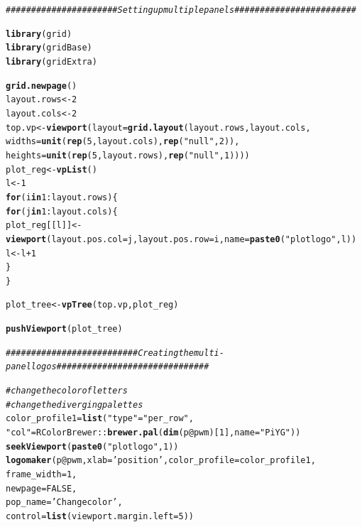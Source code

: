 \documentclass[12pt]{article}\usepackage[]{graphicx}\usepackage[usenames,dvipsnames]{color}
\makeatletter
\newcommand{\hlnum}[1]{\textcolor[rgb]{0.686,0.059,0.569}{#1}}%
\newcommand{\hlstr}[1]{\textcolor[rgb]{0.192,0.494,0.8}{#1}}%
\newcommand{\hlcom}[1]{\textcolor[rgb]{0.678,0.584,0.686}{\textit{#1}}}%
\newcommand{\hlopt}[1]{\textcolor[rgb]{0,0,0}{#1}}%
\newcommand{\hlstd}[1]{\textcolor[rgb]{0.345,0.345,0.345}{#1}}%
\newcommand{\hlkwa}[1]{\textcolor[rgb]{0.161,0.373,0.58}{\textbf{#1}}}%
\newcommand{\hlkwb}[1]{\textcolor[rgb]{0.69,0.353,0.396}{#1}}%
\newcommand{\hlkwc}[1]{\textcolor[rgb]{0.333,0.667,0.333}{#1}}%
\newcommand{\hlkwd}[1]{\textcolor[rgb]{0.737,0.353,0.396}{\textbf{#1}}}%
\newenvironment{kframe}{%
 \def\at@end@of@kframe{}%
 \ifinner\ifhmode%
  \def\at@end@of@kframe{\end{minipage}}%
  \begin{minipage}{\columnwidth}%
 \fi\fi%
 \def\FrameCommand##1{\hskip\@totalleftmargin \hskip-\fboxsep
 \colorbox{shadecolor}{##1}\hskip-\fboxsep
     \hskip-\linewidth \hskip-\@totalleftmargin \hskip\columnwidth}%
 \MakeFramed {\advance\hsize-\width
   \@totalleftmargin\z@ \linewidth\hsize
   \@setminipage}}%
 {\par\unskip\endMakeFramed%
 \at@end@of@kframe}
\newenvironment{knitrout}{}{} %
\makeatother
\begin{document}
\begin{knitrout}
\color{fgcolor}\begin{kframe}
\begin{alltt}
\hlcom{######################      Setting up multiple panels        ########################}

\hlkwd{library}\hlstd{(grid)}
\hlkwd{library}\hlstd{(gridBase)}
\hlkwd{library}\hlstd{(gridExtra)}

\hlkwd{grid.newpage}\hlstd{()}
\hlstd{layout.rows} \hlkwb{<-} \hlnum{2}
\hlstd{layout.cols} \hlkwb{<-} \hlnum{2}
\hlstd{top.vp} \hlkwb{<-} \hlkwd{viewport}\hlstd{(}\hlkwc{layout}\hlstd{=}\hlkwd{grid.layout}\hlstd{(layout.rows, layout.cols,}
                                      \hlkwc{widths}\hlstd{=}\hlkwd{unit}\hlstd{(}\hlkwd{rep}\hlstd{(}\hlnum{5}\hlstd{,layout.cols),} \hlkwd{rep}\hlstd{(}\hlstr{"null"}\hlstd{,} \hlnum{2}\hlstd{)),}
                                      \hlkwc{heights}\hlstd{=}\hlkwd{unit}\hlstd{(}\hlkwd{rep}\hlstd{(}\hlnum{5}\hlstd{,layout.rows),} \hlkwd{rep}\hlstd{(}\hlstr{"null"}\hlstd{,} \hlnum{1}\hlstd{))))}
\hlstd{plot_reg} \hlkwb{<-} \hlkwd{vpList}\hlstd{()}
\hlstd{l} \hlkwb{<-} \hlnum{1}
\hlkwa{for}\hlstd{(i} \hlkwa{in} \hlnum{1}\hlopt{:}\hlstd{layout.rows)\{}
  \hlkwa{for}\hlstd{(j} \hlkwa{in} \hlnum{1}\hlopt{:}\hlstd{layout.cols)\{}
    \hlstd{plot_reg[[l]]} \hlkwb{<-} \hlkwd{viewport}\hlstd{(}\hlkwc{layout.pos.col} \hlstd{= j,} \hlkwc{layout.pos.row} \hlstd{= i,} \hlkwc{name} \hlstd{=} \hlkwd{paste0}\hlstd{(}\hlstr{"plotlogo"}\hlstd{, l))}
    \hlstd{l} \hlkwb{<-} \hlstd{l}\hlopt{+}\hlnum{1}
  \hlstd{\}}
\hlstd{\}}


\hlstd{plot_tree} \hlkwb{<-} \hlkwd{vpTree}\hlstd{(top.vp, plot_reg)}

\hlkwd{pushViewport}\hlstd{(plot_tree)}


\hlcom{##########################   Creating the multi-panel logos   ##############################}


\hlcom{#change the color of letters}
\hlcom{#change the diverging palettes}
\hlstd{color_profile1}\hlkwb{=}\hlkwd{list}\hlstd{(}\hlstr{"type"} \hlstd{=} \hlstr{"per_row"}\hlstd{,}
\hlstr{"col"} \hlstd{= RColorBrewer}\hlopt{::}\hlkwd{brewer.pal}\hlstd{(}\hlkwd{dim}\hlstd{(p}\hlopt{@}\hlkwc{pwm}\hlstd{)[}\hlnum{1}\hlstd{],}\hlkwc{name} \hlstd{=}\hlstr{"PiYG"}\hlstd{))}
\hlkwd{seekViewport}\hlstd{(}\hlkwd{paste0}\hlstd{(}\hlstr{"plotlogo"}\hlstd{,} \hlnum{1}\hlstd{))}
\hlkwd{logomaker}\hlstd{(p}\hlopt{@}\hlkwc{pwm}\hlstd{,}\hlkwc{xlab} \hlstd{=} \hlstr{'position'}\hlstd{,}\hlkwc{color_profile} \hlstd{= color_profile1,}
          \hlkwc{frame_width} \hlstd{=} \hlnum{1}\hlstd{,}
          \hlkwc{newpage} \hlstd{=} \hlnum{FALSE}\hlstd{,}
          \hlkwc{pop_name} \hlstd{=} \hlstr{'Change color'}\hlstd{,}
          \hlkwc{control} \hlstd{=} \hlkwd{list}\hlstd{(}\hlkwc{viewport.margin.left} \hlstd{=} \hlnum{5}\hlstd{))}


\end{alltt}
\end{kframe}
\end{knitrout}
\end{document}
